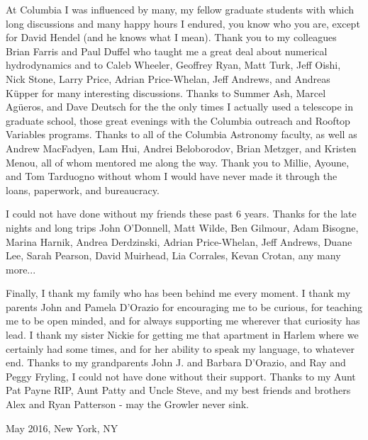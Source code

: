 At Columbia I was influenced by many, my fellow graduate students with
which long discussions and many happy hours I endured, you know who you are, 
except for David Hendel (and he knows what I mean). 
Thank you to my colleagues Brian Farris and Paul Duffel who taught me a great
deal about numerical hydrodynamics and to Caleb Wheeler, Geoffrey Ryan, Matt Turk, Jeff
Oishi, Nick Stone, Larry Price, Adrian Price-Whelan, Jeff Andrews, and Andreas
K\"upper for many interesting discussions. Thanks to Summer Ash, Marcel Ag\"ueros,
and Dave Deutsch for the the only times I actually used a telescope in
graduate school, those great evenings with the Columbia outreach and Rooftop Variables
programs. Thanks to all of the Columbia Astronomy faculty, as well as Andrew
MacFadyen, Lam Hui, Andrei Beloborodov, Brian Metzger, and Kristen Menou, all
of whom mentored me along the way. Thank you to Millie, Ayoune, and Tom
Tarduogno without whom I would have never made it through the loans,
paperwork, and bureaucracy.

I could not have done without my friends these past 6 years. Thanks for the
late nights and long trips John O'Donnell, Matt Wilde, Ben Gilmour, Adam
Bisogne, Marina Harnik, Andrea Derdzinski, Adrian Price-Whelan, Jeff Andrews,
Duane Lee, Sarah Pearson, David Muirhead, Lia Corrales, Kevan Crotan, any many more...

Finally, I thank my family who has been behind me every moment. I thank my
parents John and Pamela D'Orazio for encouraging me to be curious, for
teaching me to be open minded, and for always supporting me wherever that
curiosity has lead. I thank my sister Nickie for getting me that apartment in
Harlem where we certainly had some times, and for her ability to speak my
language, to whatever end. Thanks to my grandparents John J. and Barbara
D'Orazio, and Ray and Peggy Fryling, I could not have done without their
support. Thanks to my Aunt Pat Payne RIP, Aunt Patty and Uncle Steve, and my
best friends and brothers Alex and Ryan Patterson - may the Growler never
sink.




















\vspace{1.0cm}
May 2016, New York, NY


